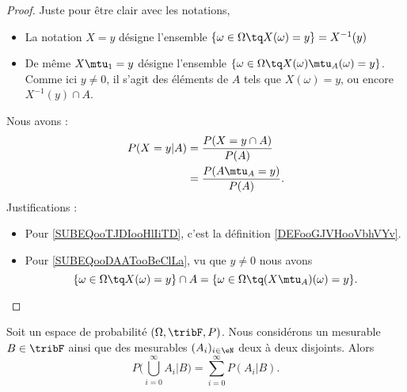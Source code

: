 \begin{proof}
    Juste pour être clair avec les notations,
    \begin{itemize}
        \item La notation \( X=y\) désigne l'ensemble \( \{ \omega\in \Omega\tq X(\omega)=y \}=X^{-1}(y)\)
        \item
            De même \( X\mtu_1=y\) désigne l'ensemble \( \{ \omega\in \Omega\tq X(\omega)\mtu_A(\omega)=y \}\). Comme ici \( y\neq 0\), il s'agit des éléments de \( A\) tels que \( X(\omega)=y\), ou encore \( X^{-1}(y)\cap A\).
    \end{itemize}
    Nous avons :
    \begin{subequations}
        \begin{align}
            P(X=y|A)&=\frac{ P(X=y\cap A) }{ P(A) }     \label{SUBEQooTJDIooHlIiTD}\\
            &=\frac{ P(A\mtu_A=y) }{ P(A) }.        \label{SUBEQooDAATooBeClLa}
        \end{align}
    \end{subequations}
    Justifications :
    \begin{itemize}
        \item Pour \eqref{SUBEQooTJDIooHlIiTD}, c'est la définition \ref{DEFooGJVHooVbhVYv}.
        \item Pour \eqref{SUBEQooDAATooBeClLa}, vu que \( y\neq 0\) nous avons
            \begin{equation}
                \{ \omega\in \Omega\tq X(\omega)=y \}\cap A=\{ \omega\in \Omega\tq (X\mtu_A)(\omega)=y \}.
            \end{equation}
    \end{itemize}
\end{proof}

\begin{lemma}        \label{LEMooRDXRooQLMRGF}
    Soit un espace de probabilité \( (\Omega,\tribF,P)\). Nous considérons un mesurable \(B\in \tribF \) ainsi que des mesurables \( (A_i)_{i\in \eN}\) deux à deux disjoints. Alors
    \begin{equation}
        P\big( \bigcup_{i=0}^{\infty}A_i|B \big)=\sum_{i=0}^{\infty}P(A_i|B).
    \end{equation}
\end{lemma}

